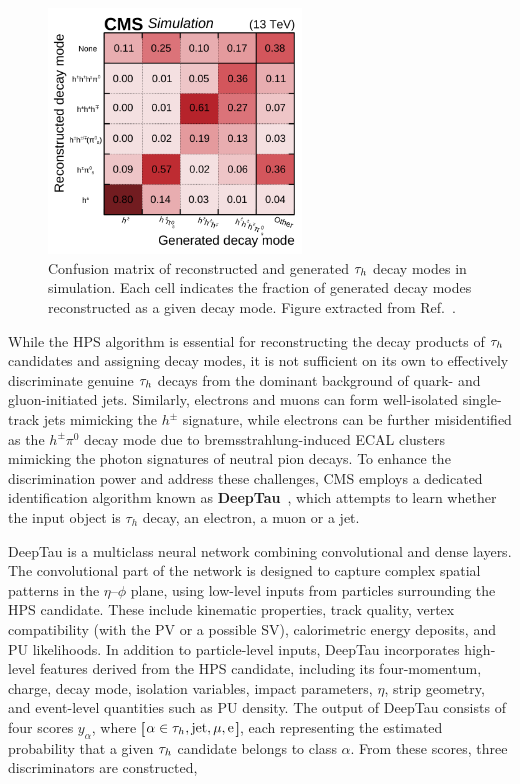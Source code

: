 \begin{figure}[h]
\centering
\includegraphics[width=0.6\textwidth]{Figures/Chapter4/HPS_DecayMode_Performance.pdf}
\caption[Hadronic tau decay mode confusion matrix]{Confusion matrix of reconstructed and generated $\tau_h$ decay modes in simulation. Each cell indicates the fraction of generated decay modes reconstructed as a given decay mode. Figure extracted from Ref.~\cite{DeepTau_20-001}.}
\label{Figure:Chapter4_HPS_ConfusionMatrix}
\end{figure}

While the HPS algorithm is essential for reconstructing the decay products of $\tau_h$ candidates and assigning decay modes, it is not sufficient on its own to effectively discriminate genuine $\tau_h$ decays from the dominant background of quark- and gluon-initiated jets. Similarly, electrons and muons can form well-isolated single-track jets mimicking the $h^\pm$ signature, while electrons can be further misidentified as the $h^\pm \pi^0$ decay mode due to bremsstrahlung-induced \ac{ECAL} clusters mimicking the photon signatures of neutral pion decays. To enhance the discrimination power and address these challenges, \ac{CMS} employs a dedicated identification algorithm known as \textbf{DeepTau}~\cite{DeepTau_20-001,DeepTau_24-001}, which attempts to learn whether the input object is $\tau_h$ decay, an electron, a muon or a jet. 

DeepTau is a multiclass neural network combining convolutional and dense layers. The convolutional part of the network is designed to capture complex spatial patterns in the $\eta$–$\phi$ plane, using low-level inputs from particles surrounding the HPS candidate. These include kinematic properties, track quality, vertex compatibility (with the PV or a possible SV), calorimetric energy deposits, and \ac{PU} likelihoods. In addition to particle-level inputs, DeepTau incorporates high-level features derived from the HPS candidate, including its four-momentum, charge, decay mode, isolation variables, impact parameters, $\eta$, strip geometry, and event-level quantities such as \ac{PU} density. The output of DeepTau consists of four scores $y_\alpha$, where \textbf{[$\alpha \in {\PGt_h,\text{jet},\mu,\text{e}}$]}, each representing the estimated probability that a given $\tau_h$ candidate belongs to class $\alpha$. From these scores, three discriminators are constructed,


